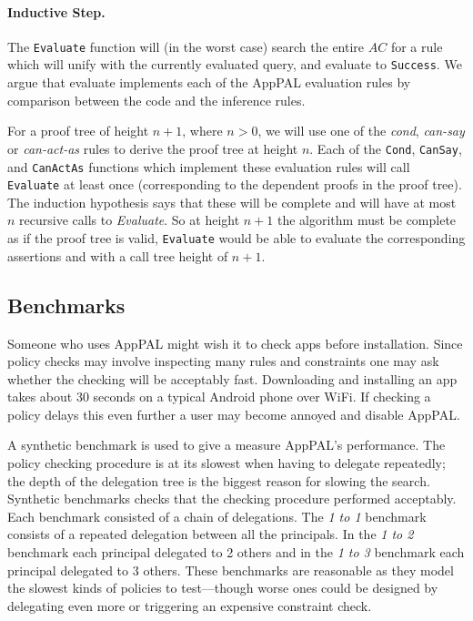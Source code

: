 \documentclass[thesis.tex]{subfiles}
\begin{document}
\paragraph*{Inductive Step.}  The \texttt{Evaluate} function will (in
the worst case) search the entire $AC$ for a rule which will unify
with the currently evaluated query, and evaluate to \texttt{Success}.
We argue that evaluate implements each of the AppPAL evaluation rules
by comparison between the code and the inference rules.

For a proof tree of height $n+1$, where $n>0$, we will use one of the
\emph{cond}, \emph{can-say} or \emph{can-act-as} rules to derive the
proof tree at height $n$.  Each of the \texttt{Cond}, \texttt{CanSay},
and \texttt{CanActAs} functions which implement these evaluation rules
will call \texttt{Evaluate} at least once (corresponding to the
dependent proofs in the proof tree).  The induction hypothesis says
that these will be complete and will have at most $n$ recursive
calls to \emph{Evaluate}.  So at height $n+1$ the algorithm must be
complete as if the proof tree is valid, \texttt{Evaluate} would be
able to evaluate the corresponding assertions and with a call tree
height of $n+1$.

\subsection{Benchmarks}
\label{ssec:benchmarks}

Someone who uses AppPAL might wish it to check apps before installation. Since
policy checks may involve inspecting many rules and constraints one may ask
whether the checking will be acceptably fast. Downloading and installing an app
takes about 30 seconds on a typical Android phone over WiFi. If checking a
policy delays this even further a user may become annoyed and disable AppPAL.

A synthetic benchmark is used to give a measure AppPAL's performance. The policy
checking procedure is at its slowest when having to delegate repeatedly; the
depth of the delegation tree is the biggest reason for slowing the search.
Synthetic benchmarks checks that the checking procedure performed acceptably.
Each benchmark consisted of a chain of delegations. The \emph{1 to 1} benchmark
consists of a repeated delegation between all the principals. In the \emph{1 to
2} benchmark each principal delegated to 2 others and in the \emph{1 to 3}
benchmark each principal delegated to 3 others. These benchmarks are reasonable
as they model the slowest kinds of policies to test---though worse ones could be
designed by delegating even more or triggering an expensive constraint check.
\end{document}
